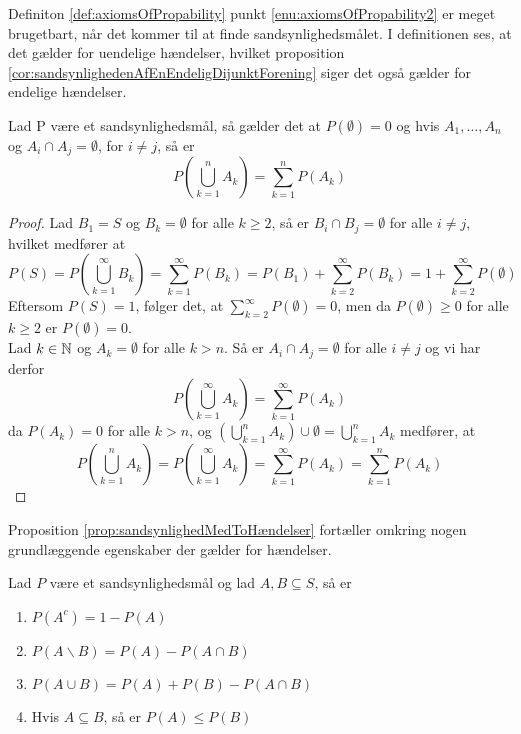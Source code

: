 Definiton \ref{def:axiomsOfPropability} punkt \ref{enu:axiomsOfPropability2} er meget brugetbart, når det kommer til at finde sandsynlighedsmålet. I definitionen ses, at det gælder for uendelige hændelser, hvilket proposition \ref{cor:sandsynlighedenAfEnEndeligDijunktForening} siger det også gælder for endelige hændelser. 

\begin{prop} \label{cor:sandsynlighedenAfEnEndeligDijunktForening} %
Lad P være et sandsynlighedsmål, så gælder det at $P(\emptyset) = 0$ og hvis $A_1, \ldots , A_n$ og $A_i\cap A_j=\emptyset$, for $i \neq j$, så er
\begin{equation*}
    P\left(\bigcup^n_{k = 1} A_k\right) = \sum^n_{k = 1} P(A_k)
\end{equation*}
\end{prop}
\begin{proof}
Lad $B_1 = S$ og $B_k = \emptyset$ for alle $k \geq 2$, så er $B_i \cap B_j = \emptyset$ for alle $i \neq j$, hvilket medfører at \begin{equation*}
    P(S) = P\left(\bigcup^\infty_{k = 1} B_k\right) = \sum^\infty_{k = 1} P(B_k) = P(B_1) + \sum^\infty_{k = 2} P(B_k) = 1 + \sum^\infty_{k = 2} P(\emptyset) 
\end{equation*}
Eftersom $P(S) = 1$, følger det, at $\sum^\infty_{k = 2} P(\emptyset) = 0$, men da $P(\emptyset) \geq 0$ for alle $k \geq 2$ er $P(\emptyset) = 0$. \\
Lad $k\in \mathbb{N}$ og $A_k = \emptyset$ for alle $k > n$. Så er $A_i \cap A_j = \emptyset$ for alle $i \neq j$ og vi har derfor 
\begin{equation*}
    P\left(\bigcup_{k=1}^\infty A_k\right)=\sum_{k=1}^\infty P(A_k)
\end{equation*}
da $P(A_k) = 0$ for alle $k > n$, og $\displaystyle\left(\bigcup^n_{k = 1} A_k\right) \cup \emptyset = \bigcup^n_{k = 1} A_k$ medfører, at
\begin{equation*}
   P\left(\bigcup_{k=1}^n A_k\right) = P\left(\bigcup_{k=1}^\infty A_k\right) = \sum_{k=1}^\infty P(A_k) = \sum_{k=1}^n P(A_k)
\end{equation*}
\end{proof} 
Proposition \ref{prop:sandsynlighedMedToHændelser} fortæller omkring nogen grundlæggende egenskaber der gælder for hændelser. 
\begin{prop} \label{prop:sandsynlighedMedToHændelser} %
Lad $P$ være et sandsynlighedsmål og lad $A, B \subseteq S$, så er 
\begin{enumerate}
    \item $P(A^c) = 1 - P(A)$ \label{enu:propsandsynlighedMedToHændelser1}
    \item $P(A\backslash B) = P(A) - P(A \cap B)$ 
    \item $P(A \cup B) = P(A) + P(B) - P(A \cap B)$ 
    \item Hvis $A \subseteq B$, så er $P(A) \leq P(B)$
\end{enumerate}
\end{prop}
